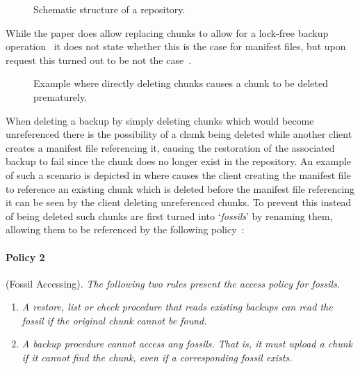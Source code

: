 \begin{figure}
    
    \caption{Schematic structure of a repository.}\label{fig:repository-structure}
\end{figure}

While the paper does allow replacing chunks to allow for a lock-free backup
operation~\cite[Theorem 1]{Duplicacy} it does not state whether this is the case
for manifest files, but upon request this turned out to be not the
case~\cite[topic `Duplicacy paper data loss ']{Duplicacy-Forum}.

\begin{figure}
    
    \caption{Example where directly deleting chunks causes a chunk to be deleted prematurely.}\label{fig:naive-deletion}
\end{figure}

When deleting a backup by simply deleting chunks which would become unreferenced
there is the possibility of a chunk being deleted while another client creates a
manifest file referencing it, causing the restoration of the associated backup to
fail since the chunk does no longer exist in the repository.
An example of such a scenario is depicted in  where
 causes the client creating the manifest file to reference
an existing chunk which is deleted before the manifest file referencing it can
be seen by the client deleting unreferenced chunks.
To prevent this instead of being deleted such chunks are first turned into `\textit{fossils}'
by renaming them, allowing them to be referenced by the following policy~\cite{Duplicacy}:

\begin{samepage}
    \paragraph{Policy 2}\label{para:policy2} (Fossil Accessing).
    \textit{The following two rules present the access policy for fossils.}
    \begin{enumerate}
        \item \textit{
            A restore, list or check procedure that reads existing backups can
            read the fossil if the original chunk cannot be found.
        }
        \item \textit{
            A backup procedure cannot access any fossils. That is, it must upload
            a chunk if it cannot find the chunk, even if a corresponding fossil exists.
        }
    \end{enumerate}
\end{samepage}


